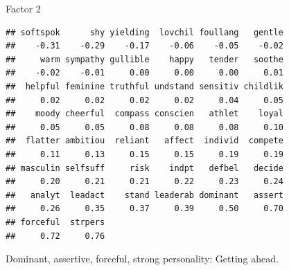 \begin{frame}[fragile]{Factor 2}
  
  {\footnotesize
\begin{knitrout}
\color{fgcolor}\begin{kframe}
\begin{alltt}
\hlstd{mylist[[}\hlstd{]]}
\end{alltt}
\begin{verbatim}
## softspok      shy yielding  lovchil foullang   gentle 
##    -0.31    -0.29    -0.17    -0.06    -0.05    -0.02 
##     warm sympathy gullible    happy   tender   soothe 
##    -0.02    -0.01     0.00     0.00     0.00     0.01 
##  helpful feminine truthful undstand sensitiv childlik 
##     0.02     0.02     0.02     0.02     0.04     0.05 
##    moody cheerful  compass conscien   athlet    loyal 
##     0.05     0.05     0.08     0.08     0.08     0.10 
##  flatter ambitiou  reliant   affect  individ  compete 
##     0.11     0.13     0.15     0.15     0.19     0.19 
## masculin selfsuff     risk    indpt   defbel   decide 
##     0.20     0.21     0.21     0.22     0.23     0.24 
##   analyt  leadact    stand leaderab dominant   assert 
##     0.26     0.35     0.37     0.39     0.50     0.70 
## forceful  strpers 
##     0.72     0.76
\end{verbatim}
\end{kframe}
\end{knitrout}
}

Dominant, assertive, forceful, strong personality: Getting ahead.

\end{frame}

